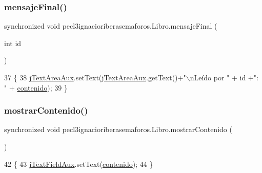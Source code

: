 \subsubsection{\texorpdfstring{mensaje\+Final()}{mensajeFinal()}}
{\footnotesize\ttfamily synchronized void pecl3ignacioriberasemaforos.\+Libro.\+mensaje\+Final (\begin{DoxyParamCaption}\item[{int}]{id }\end{DoxyParamCaption})\hspace{0.3cm}{\ttfamily [inline]}}


\begin{DoxyCode}
37     \{
38         \mbox{\hyperlink{classpecl3ignacioriberasemaforos_1_1_libro_ab049d0206067da023a6231357b7efc75}{jTextAreaAux}}.setText(\mbox{\hyperlink{classpecl3ignacioriberasemaforos_1_1_libro_ab049d0206067da023a6231357b7efc75}{jTextAreaAux}}.getText()+\textcolor{stringliteral}{"\(\backslash\)nLeído por "} + \textcolor{keywordtype}{id} +\textcolor{stringliteral}{": "} + 
      \mbox{\hyperlink{classpecl3ignacioriberasemaforos_1_1_libro_ab2fc8d572a85bf24b8c3558b7739d8a8}{contenido}});
39     \}
\end{DoxyCode}
\mbox{\label{classpecl3ignacioriberasemaforos_1_1_libro_adf6ca4b4723c810075def5c4c6f4a07c}} 
\subsubsection{\texorpdfstring{mostrar\+Contenido()}{mostrarContenido()}}
{\footnotesize\ttfamily synchronized void pecl3ignacioriberasemaforos.\+Libro.\+mostrar\+Contenido (\begin{DoxyParamCaption}{ }\end{DoxyParamCaption})\hspace{0.3cm}{\ttfamily [inline]}}


\begin{DoxyCode}
42     \{
43         \mbox{\hyperlink{classpecl3ignacioriberasemaforos_1_1_libro_a4688b8afa2701493ac45bfbc35b1f8ca}{jTextFieldAux}}.setText(\mbox{\hyperlink{classpecl3ignacioriberasemaforos_1_1_libro_ab2fc8d572a85bf24b8c3558b7739d8a8}{contenido}});
44     \}
\end{DoxyCode}
\mbox{\label{classpecl3ignacioriberasemaforos_1_1_libro_a73e931357770752d63a701195a996f09}} 
